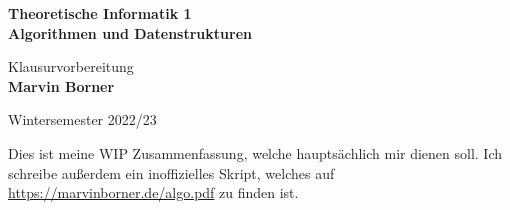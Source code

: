 \begin{titlepage}
	\begin{center}
		\vspace*{1cm}

		{\huge\textbf{Theoretische Informatik 1\bigskip\\Algorithmen und Datenstrukturen}}

		\vspace{0.5cm}
		{\Large Klausurvorbereitung}\\
		\textbf{Marvin Borner}

		\vfill
		Wintersemester 2022/23
	\end{center}
\end{titlepage}

\pagebreak\hspace{0pt}\vfill\begin{center}{\Large Dies ist meine WIP Zusammenfassung, welche hauptsächlich mir dienen soll. Ich schreibe außerdem ein inoffizielles Skript, welches auf \url{https://marvinborner.de/algo.pdf} zu finden ist.}\end{center}\vfill\hspace{0pt}\pagebreak

